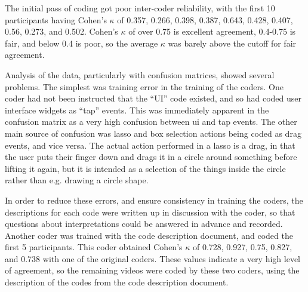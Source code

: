 The initial pass of coding got poor inter-coder reliability, with the first 10 participants having Cohen's $\kappa$ of 0.357, 0.266, 0.398, 0.387, 0.643, 0.428, 0.407, 0.56, 0.273, and 0.502. 
Cohen's $\kappa$ of over 0.75 is excellent agreement, 0.4-0.75 is fair, and below 0.4 is poor, so the average $\kappa$ was barely above the cutoff for fair agreement. 

Analysis of the data, particularly with confusion matrices, showed several problems. 
The simplest was training error in the training of the coders.
One coder had not been instructed that the ``UI'' code existed, and so had coded user interface widgets as ``tap'' events.   
This was immediately apparent in the confusion matrix as a very high confusion between ui and tap events. 
The other main source of confusion was lasso and box selection actions being coded as drag events, and vice versa.
The actual action performed in a lasso is a drag, in that the user puts their finger down and drags it in a circle around something before lifting it again, but it is intended as a selection of the things inside the circle rather than e.g. drawing a circle shape. 

In order to reduce these errors, and ensure consistency in training the coders, the descriptions for each code were written up in discussion with the coder, so that questions about interpretations could be answered in advance and recorded. 
Another coder was trained with the code description document, and coded the first 5 participants. 
This coder obtained Cohen's $\kappa$ of 0.728, 0.927, 0.75, 0.827, and 0.738 with one of the original coders.
These values indicate a very high level of agreement, so the remaining videos were coded by these two coders, using the description of the codes from the code description document.  

